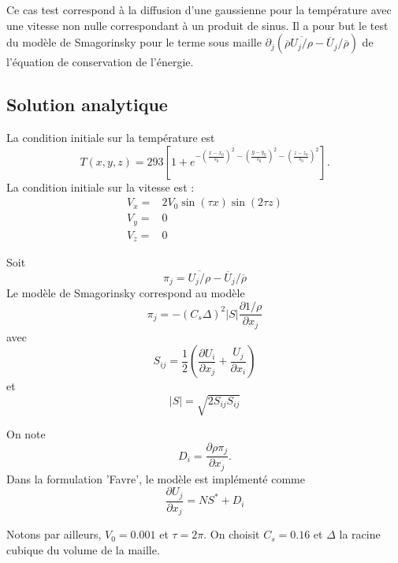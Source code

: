 Ce cas test correspond \`a la diffusion d'une gaussienne pour la temp\'erature avec une vitesse non nulle correspondant \`a un produit de sinus. Il a pour but le test du mod\`ele de Smagorinsky pour le terme sous maille $\partial_j\left(\overline{\rho} \overline{U_j/\rho} - \overline{U}_j/\overline{\rho}\right)$ de l'\'equation de conservation de l'\'energie.

\subsection{Solution analytique}

La condition initiale sur la temp\'erature est
\begin{equation}
T\left(x,y,z\right) = 293 \left[1 + e^{-\left(\frac{x-x_0}{s_0}\right)^2-\left(\frac{y-y_0}{s_0}\right)^2-\left(\frac{z-z_0}{s_0}\right)^2}\right].
\end{equation}
La condition initiale sur la vitesse est :
\begin{align*}
V_x ={}& 2 V_0 \sin(\tau x) \sin(2 \tau z) \\
V_y ={}& 0 \\
V_z ={}& 0
\end{align*}

Soit
\begin{equation}
\pi_{j} = \overline{U_j/\rho} - \overline{U}_j/\overline{\rho}
\end{equation}
Le mod\`ele de Smagorinsky correspond au mod\`ele
\begin{equation}
\pi_{j} = - \left(C_s \Delta\right)^2 \left|S\right| \frac{\partial 1/\rho}{\partial x_j}
\end{equation}
avec
\begin{equation}
S_{ij} = \frac{1}{2}\left(\frac{\partial U_i}{\partial x_j} + \frac{U_j}{\partial x_i}\right)
\end{equation}
et
\begin{equation}
\left|S\right| = \sqrt{2 S_{ij} S_{ij}}
\end{equation}

On note
\begin{equation}
D_i = \frac{\partial \rho \pi_{j}}{\partial x_j}.
\end{equation}
Dans la formulation 'Favre', le mod\`ele est impl\'ement\'e comme
\begin{equation}
\frac{\partial U_{j}}{\partial x_j} = NS^* + D_i
\end{equation}

Notons par ailleurs, $V_0 = 0.001$ et $\tau=2\pi$. On choisit $C_s=0.16$ et $\Delta$ la racine cubique du volume de la maille.

